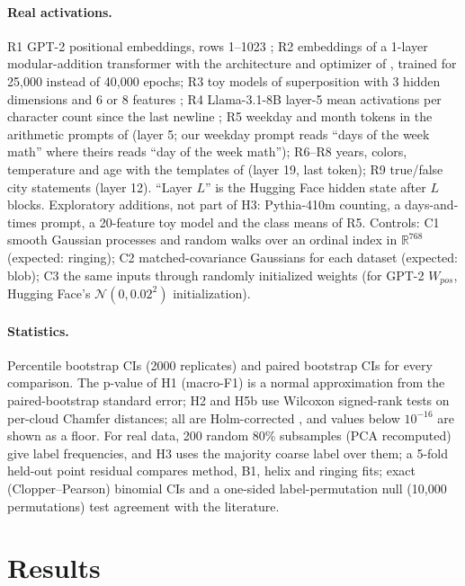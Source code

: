 \documentclass[10pt]{article}
\begin{document}
\paragraph{Real activations.} R1 GPT-2 positional embeddings, rows 1--1023 \citep{radford2019gpt2,yedidia2023helix}; R2 embeddings of a 1-layer modular-addition transformer with the architecture and optimizer of \citet{nanda2023progress}, trained for 25{,}000 instead of 40{,}000 epochs; R3 toy models of superposition with 3 hidden dimensions and 6 or 8 features \citep{elhage2022tms}; R4 Llama-3.1-8B \citep{grattafiori2024llama3} layer-5 mean activations per character count since the last newline \citep{gurnee2025linebreaks,sinii2026counting}; R5 weekday and month tokens in the arithmetic prompts of \citet{engels2025notall} (layer 5; our weekday prompt reads ``days of the week math'' where theirs reads ``day of the week math''); R6--R8 years, colors, temperature and age with the templates of \citet{bhalla2026sae} (layer 19, last token); R9 true/false city statements \citep{marks2024truth} (layer 12). ``Layer $L$'' is the Hugging Face hidden state after $L$ blocks. Exploratory additions, not part of H3: Pythia-410m \citep{biderman2023pythia} counting, a days-and-times prompt, a 20-feature toy model and the class means of R5. Controls: C1 smooth Gaussian processes and random walks over an ordinal index in $\mathbb{R}^{768}$ (expected: ringing); C2 matched-covariance Gaussians for each dataset (expected: blob); C3 the same inputs through randomly initialized weights (for GPT-2 $W_{pos}$, Hugging Face's $\mathcal{N}(0,0.02^2)$ initialization).
\paragraph{Statistics.} Percentile bootstrap CIs (2000 replicates) and paired bootstrap CIs for every comparison. The p-value of H1 (macro-F1) is a normal approximation from the paired-bootstrap standard error; H2 and H5b use Wilcoxon signed-rank tests on per-cloud Chamfer distances; all are Holm-corrected \citep{holm1979}, and values below $10^{-16}$ are shown as a floor. For real data, 200 random 80\% subsamples (PCA recomputed) give label frequencies, and H3 uses the majority coarse label over them; a 5-fold held-out point residual compares method, B1, helix and ringing fits; exact (Clopper--Pearson) binomial CIs and a one-sided label-permutation null (10{,}000 permutations) test agreement with the literature.

\section{Results}
\label{sec:results}

\end{document}
